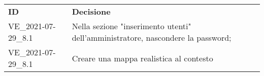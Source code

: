 \documentclass[]{article}
\begin{document}
	\begin{table} [h!]
		\begin{center}
			\begin{tabular} { m{2cm} m{14cm} }
				\rowcolor{lightgray}
				\textbf{ID} & \textbf{Decisione}\\
				VE\_2021-07-29\_8.1 & Nella sezione "inserimento utenti" dell'amministratore, nascondere la password; \\
				VE\_2021-07-29\_8.1& Creare una mappa realistica al contesto\\
			\end{tabular}
		\end{center}
	\end{table}
\end{document}
